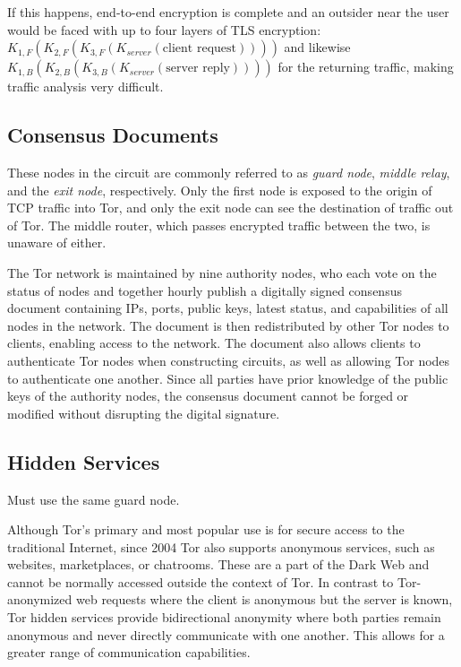  If this happens, end-to-end encryption is complete and an outsider near the user would be faced with up to four layers of TLS encryption: $K_{1,F}(K_{2,F}(K_{3,F}(K_{server}(\textrm{client\ request}))))$ and likewise $K_{1,B}(K_{2,B}(K_{3,B}(K_{server}(\textrm{server\ reply}))))$ for the returning traffic, making traffic analysis very difficult.

\subsection{Consensus Documents}
\label{sec:ConsensusDocs}

These nodes in the circuit are commonly referred to as \textit{guard node}, \textit{middle relay}, and the \textit{exit node}, respectively. Only the first node is exposed to the origin of TCP traffic into Tor, and only the exit node can see the destination of traffic out of Tor. The middle router, which passes encrypted traffic between the two, is unaware of either. 

The Tor network is maintained by nine authority nodes, who each vote on the status of nodes and together hourly publish a digitally signed consensus document containing IPs, ports, public keys, latest status, and capabilities of all nodes in the network. The document is then redistributed by other Tor nodes to clients, enabling access to the network. The document also allows clients to authenticate Tor nodes when constructing circuits, as well as allowing Tor nodes to authenticate one another. Since all parties have prior knowledge of the public keys of the authority nodes, the consensus document cannot be forged or modified without disrupting the digital signature.\cite{xin2009design}

\subsection{Hidden Services}
\label{sec:HiddenServices}

Must use the same guard node.\cite{bauer2007low}\cite{overlier2006locating}

Although Tor's primary and most popular use is for secure access to the traditional Internet, since 2004 Tor also supports anonymous services, such as websites, marketplaces, or chatrooms. These are a part of the Dark Web and cannot be normally accessed outside the context of Tor. In contrast to Tor-anonymized web requests where the client is anonymous but the server is known, Tor hidden services provide bidirectional anonymity where both parties remain anonymous and never directly communicate with one another. This allows for a greater range of communication capabilities.\cite{nicolussi2011human}


